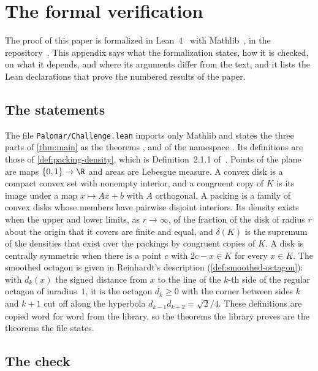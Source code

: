 \section{The formal verification}\label{app:formal}

The proof of this paper is formalized in Lean~4~\cite{Lean4} with Mathlib~\cite{Mathlib20}, in the
repository~\cite{Companion}. This appendix says what the formalization states, how it is checked,
on what it depends, and where its arguments differ from the text, and it lists the Lean
declarations that prove the numbered results of the paper.

\subsection{The statements}\label{app:formal-statements}

The file \texttt{Palomar/Challenge.lean} imports only Mathlib and states the three parts of
\cref{thm:main} as the theorems ,  and
 of the namespace . Its definitions are those of
\cref{def:packing-density}, which is Definition~2.1.1 of~\cite{HalesVajjha2024}. Points of the
plane are maps $\{0,1\}\to\R$ and areas are Lebesgue measure. A convex disk is a compact convex set
with nonempty interior, and a congruent copy of $K$ is its image under a map $x\mapsto Ax+b$ with
$A$ orthogonal. A packing is a family of convex disks whose members have pairwise disjoint
interiors. Its density exists when the upper and lower limits, as $r\to\infty$, of the fraction of
the disk of radius $r$ about the origin that it covers are finite and equal, and $\delta(K)$ is the
supremum of the densities that exist over the packings by congruent copies of $K$. A disk is
centrally symmetric when there is a point $c$ with $2c-x\in K$ for every $x\in K$. The smoothed
octagon is given in Reinhardt's description (\cref{def:smoothed-octagon}): with $d_k(x)$ the signed
distance from $x$ to the line of the $k$-th side of the regular octagon of inradius~$1$, it is the
octagon $d_k\ge0$ with the corner between sides $k$ and $k+1$ cut off along the hyperbola
$d_{k-1}d_{k+2}=\sqrt2/4$. These definitions are copied word for word from the library, so the
theorems the library proves are the theorems the file states.

\subsection{The check}\label{app:formal-check}

